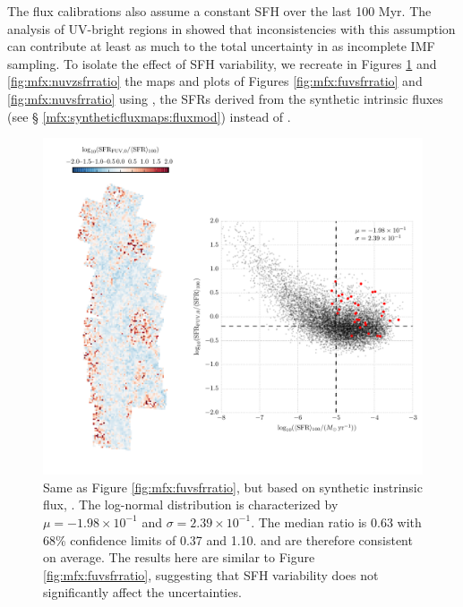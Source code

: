 The flux calibrations also assume a constant SFH over the last 100 Myr. The
analysis of UV-bright regions in \citet{Simones:2014} showed that
inconsistencies with this assumption can contribute at least as much to the
total uncertainty in \sfrfuv{} as incomplete IMF sampling. To isolate the
effect of SFH variability, we recreate in Figures \ref{fig:mfx:fuvzsfrratio}
and \ref{fig:mfx:nuvzsfrratio} the maps and plots of Figures
\ref{fig:mfx:fuvsfrratio} and \ref{fig:mfx:nuvsfrratio} using \sfrxz{}, the
SFRs derived from the synthetic intrinsic fluxes (see \S
\ref{mfx:syntheticfluxmaps:fluxmod}) instead of \sfrx{}.


\begin{figure}
\centering
\includegraphics[width=\textwidth]{m31flux-figures/sfr_fuv0-vs-mean.pdf}
\caption[Ratio of the \sfr{} based on the synthetic intrinsic \fuv{} flux to
the $100\myr$ mean \sfr{}.]{Same as Figure \ref{fig:mfx:fuvsfrratio}, but based
    on synthetic instrinsic flux, \sfrfuvz{}. The log-normal distribution is
    characterized by $\mu = -1.98\times 10^{-1}$ and $\sigma = 2.39\times
    10^{-1}$. The median ratio is 0.63 with 68\% confidence limits of 0.37 and
    1.10. \sfrfuvz{} and \sfroneh{} are therefore consistent on average. The
    results here are similar to Figure \ref{fig:mfx:fuvsfrratio}, suggesting
    that SFH variability does not significantly affect the \sfrfuv{}
    uncertainties.
}
\label{fig:mfx:fuvzsfrratio}
\end{figure}


